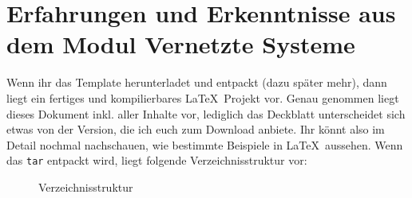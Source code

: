 \section{Erfahrungen und Erkenntnisse aus dem Modul Vernetzte Systeme}\label{struktur}

Wenn ihr das Template herunterladet und entpackt (dazu später mehr), dann liegt
ein fertiges und kompilierbares \LaTeX~Projekt vor. Genau genommen liegt dieses
Dokument inkl. aller Inhalte vor, lediglich das Deckblatt unterscheidet sich
etwas von der Version, die ich euch zum Download anbiete. Ihr könnt also im
Detail nochmal nachschauen, wie bestimmte Beispiele in \LaTeX~aussehen. Wenn
das \texttt{tar} entpackt wird, liegt folgende Verzeichnisstruktur vor:

\FloatBarrier
\begin{figure}[!ht]
	\caption[Verzeichnisstruktur]{Verzeichnisstruktur}
	\label{dirtree}
\end{figure}
\FloatBarrier

